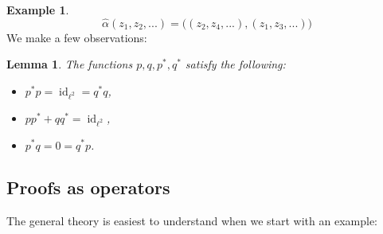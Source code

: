 \documentclass[12pt]{article}
\theoremstyle{plain}
\newtheorem{lemma}[thm]{Lemma}
\theoremstyle{definition}
\newtheorem{example}[thm]{Example}
\begin{document}
\begin{example}
\begin{equation}
			\hat{\alpha}(z_1,z_2,...) = \big((z_2,z_4,...),(z_1,z_3,...)\big)
		\end{equation}
		We make a few observations:
		\begin{lemma}\label{lem:operator_properties}
			The functions $p,q,p^\ast,q^\ast$ satisfy the following:
			\begin{itemize}
				\item $p^\ast p = \operatorname{id}_{\ell^2} = q^\ast q$,
				\item $p p^\ast + q q^\ast = \operatorname{id}_{\ell^2}$,
				\item $p^\ast q = 0 = q^\ast p$.
			\end{itemize}
		\end{lemma}
	\end{example}
	\subsection{Proofs as operators}
	The general theory is easiest to understand when we start with an example:
\end{document}
